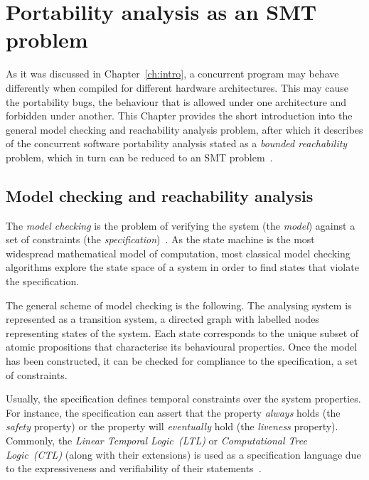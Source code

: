 \chapter{Portability analysis as an SMT problem}
\label{ch:enc}

As it was discussed in Chapter~\ref{ch:intro}, a concurrent program may behave differently when compiled for different hardware architectures.
This may cause the portability bugs, the behaviour that is allowed under one architecture and forbidden under another. 
This Chapter provides the short introduction into the general model checking and reachability analysis problem, after which it describes of the concurrent software portability analysis stated as a \textit{bounded reachability} problem, which in turn can be reduced to an SMT problem~\cite{Porthos17b}.


\section{Model checking and reachability analysis}
\label{ch:enc:mc}

The \textit{model checking} is the problem of verifying the system (the \textit{model}) against a set of constraints (the \textit{specification})~\cite{dkw2008}.
As the state machine is the most widespread mathematical model of computation, most classical model checking algorithms explore the state space of a system in order to find states that violate the specification.

The general scheme of model checking is the following.
The analysing system is represented as a transition system, a directed graph with labelled nodes representing states of the system.
Each state corresponds to the unique subset of atomic propositions that characterise its behavioural properties.
Once the model has been constructed, it can be checked for compliance to the specification, a set of constraints.

Usually, the specification defines temporal constraints over the system properties.
For instance, the specification can assert that the property \textit{always} holds (the \textit{safety} property) or the property will \textit{eventually} hold (the \textit{liveness} property).
Commonly, the \textit{Linear Temporal Logic~(LTL)} or \textit{Computational Tree Logic~(CTL)} (along with their extensions) is used as a specification language due to the expressiveness and verifiability of their statements~\cite{clarke1999model}.

